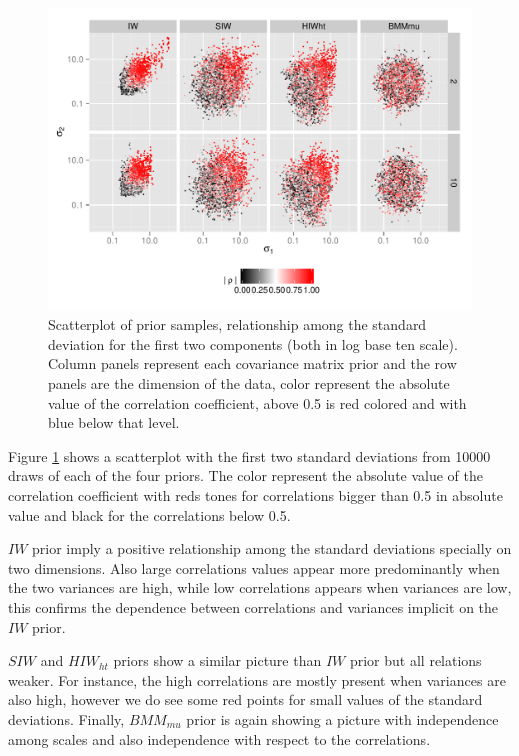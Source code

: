 \documentclass[a4paper]{article}
\begin{document}
\begin{figure}[htbp]
\begin{center}
 \includegraphics[width=\textwidth ]{prior_sis2} 
  \vspace{-.5in}
\caption{Scatterplot of prior samples, relationship among the standard deviation for the first two components (both in log base ten scale).  Column panels represent each covariance matrix prior and the row panels are the dimension of the data, color represent the absolute value of the correlation coefficient, above 0.5 is red colored and with blue below that level.  \label{priorF2}}
\end{center}
\end{figure}

Figure \ref{priorF2} shows a scatterplot with the first two standard deviations from 10000 draws of each of the four priors. The color represent the absolute value of the correlation coefficient with reds tones for correlations bigger than 0.5 in absolute value and black for the correlations below 0.5. 

$IW$ prior imply a positive relationship among the standard deviations specially on two dimensions. Also large correlations values appear more predominantly when the two variances are high, while low correlations appears when variances are low, this confirms the dependence between correlations and variances implicit on the $IW$ prior. 

$SIW$ and $HIW_{ht}$ priors show a similar picture than $IW$ prior but all relations weaker. For instance, the high correlations are mostly present when variances are also high, however we do see some red points for small values of the standard deviations. 
Finally,  $BMM_{mu}$ prior is again showing a picture with independence among scales and also independence with respect to the correlations. 
\end{document}
